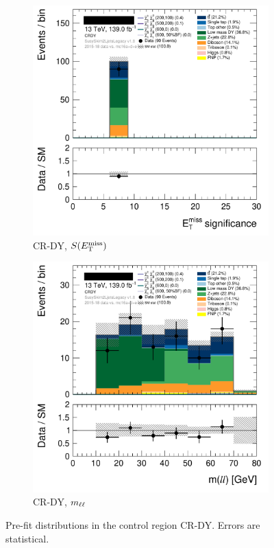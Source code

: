 \begin{figure}[tp]
\centering
\begin{subfigure}{0.48\textwidth}
\centering
\includegraphics[width=\textwidth]{figures/2ljets_def_met_Sign_CRDY.png}
\caption{CR-DY, $S(E_\mathrm{T}^\mathrm{miss})$}
\end{subfigure}
\hfill
\begin{subfigure}{0.48\textwidth}
\centering
\includegraphics[width=\textwidth]{figures/2ljets_def_mll_CRDY.png}
\caption{CR-DY, $m_{\ell\ell}$}
\end{subfigure}
\caption{%
Pre-fit distributions in the control region CR-DY.
Errors are statistical.
}
\label{fig:2ljets_offshell_cr_region}
\end{figure}


